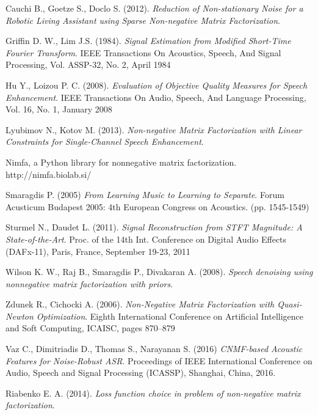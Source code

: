 \documentclass[11pt]{article}
\begin{document}
\begin{thebibliography}{99}

 Cauchi B., Goetze S., Doclo S. (2012). \textit{Reduction of Non-stationary Noise for a Robotic Living Assistant using Sparse Non-negative Matrix Factorization}.

 Griffin D. W., Lim J.S. (1984). \textit{Signal  Estimation  from  Modified  Short-Time Fourier  Transform}. IEEE Transactions On Acoustics, Speech, And Signal Processing,  Vol. ASSP-32, No. 2, April 1984

 Hu Y., Loizou P. C. (2008). \textit{Evaluation of Objective Quality Measures
for Speech Enhancement}. IEEE Transactions On Audio, Speech, And Language Processing,  Vol. 16, No. 1, January 2008

 Lyubimov N., Kotov M. (2013). \textit{Non-negative Matrix Factorization with Linear Constraints for Single-Channel Speech Enhancement}.

 Nimfa, a Python library for nonnegative matrix factorization. http://nimfa.biolab.si/

 Smaragdis P. (2005) \textit{From Learning Music to Learning to Separate}. Forum Acusticum Budapest 2005: 4th European Congress on Acoustics. (pp. 1545-1549)

 Sturmel N., Daudet L. (2011). \textit{Signal Reconstruction from STFT Magnitude: A State-of-the-Art}. Proc. of the 14th Int. Conference on Digital Audio Effects (DAFx-11), Paris, France, September 19-23, 2011

 Wilson K. W., Raj B., Smaragdis P., Divakaran A. (2008). \textit{Speech denoising using nonnegative matrix factorization with priors}.

 Zdunek R., Cichocki A. (2006). \textit{Non-Negative Matrix Factorization with Quasi-Newton Optimization}. Eighth International Conference on Artificial Intelligence and Soft Computing, ICAISC, pages 870–879

 Vaz C., Dimitriadis D., Thomas S., Narayanan S. (2016) \textit{CNMF-based Acoustic Features for Noise-Robust ASR}. Proceedings of IEEE International Conference on Audio, Speech and Signal Processing (ICASSP), Shanghai, China, 2016.

 Riabenko E. A. (2014). \textit{Loss function choice in problem of non-negative matrix factorization}.


\end{thebibliography}
\end{document}
